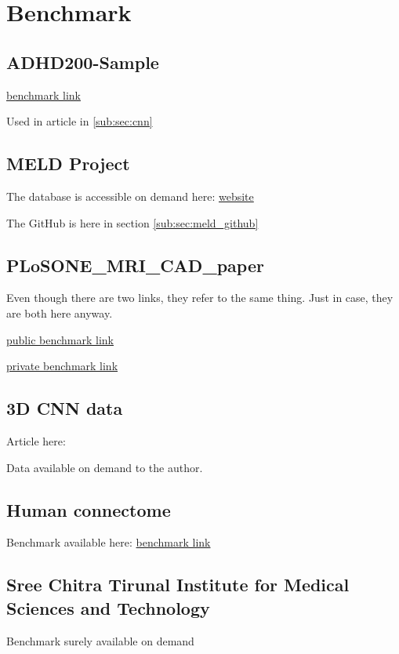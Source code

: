 \chapter{Benchmark}

\section{ADHD200-Sample}

\href{https://fcon_1000.projects.nitrc.org/indi/adhd200/}{benchmark link}

Used in article in \ref{sub:sec:cnn}

\section{MELD Project}

The database is accessible on demand here: \href{https://meldproject.github.io//}{website}

The GitHub is here in section \ref{sub:sec:meld_github}

\section{PLoSONE\_MRI\_CAD\_paper}

Even though there are two links, they refer to the same thing. Just in case, they are both here anyway.

\href{https://figshare.com/articles/journal_contribution/PLoSONE_MRI_CAD_paper/3573471?file=5653479}{public benchmark link}

\href{https://figshare.com/s/70178bc154bd83258322?file=5653479}{private benchmark link}

\section{3D CNN data}

Article here: 

Data available on demand to the author.

\section{Human connectome}

Benchmark available here: \href{https://www.humanconnectome.org/study/hcp-young-adult}{benchmark link}

\section{Sree Chitra Tirunal Institute for Medical Sciences and Technology}

Benchmark surely available on demand
